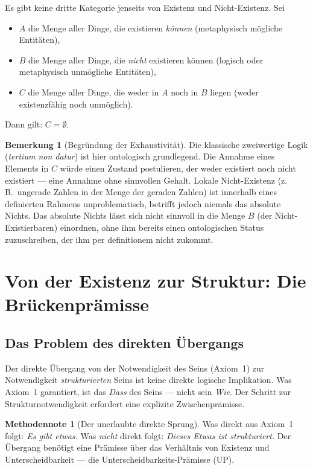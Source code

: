 \documentclass[11pt,a4paper]{article}
\theoremstyle{plain}
\theoremstyle{definition}
\newtheorem{remark}{Bemerkung}[section]
\newtheorem{methodennote}{Methodennote}[section]
\begin{document}
Es gibt keine dritte Kategorie jenseits von Existenz und Nicht-Existenz. Sei
\begin{itemize}
  \item $A$ die Menge aller Dinge, die existieren \emph{k\"{o}nnen} (metaphysisch m\"{o}gliche
        Entit\"{a}ten),
  \item $B$ die Menge aller Dinge, die \emph{nicht} existieren k\"{o}nnen (logisch oder
        metaphysisch unm\"{o}gliche Entit\"{a}ten),
  \item $C$ die Menge aller Dinge, die weder in $A$ noch in $B$ liegen (weder existenzf\"{a}hig
        noch unm\"{o}glich).
\end{itemize}
Dann gilt: $C = \emptyset$.

\begin{remark}[Begr\"{u}ndung der Exhaustivit\"{a}t]
Die klassische zweiwertige Logik (\emph{tertium non datur}) ist hier ontologisch
grundlegend. Die Annahme eines Elements in $C$ w\"{u}rde einen Zustand postulieren, der
weder existiert noch nicht existiert --- eine Annahme ohne sinnvollen Gehalt. Lokale
Nicht-Existenz (z.\,B.\ ungerade Zahlen in der Menge der geraden Zahlen) ist innerhalb
eines definierten Rahmens unproblematisch, betrifft jedoch niemals das absolute Nichts.
Das absolute Nichts l\"{a}sst sich nicht sinnvoll in die Menge $B$ (der
Nicht-Existierbaren) einordnen, ohne ihm bereits einen ontologischen Status zuzuschreiben,
der ihm per definitionem nicht zukommt.
\end{remark}

\section{Von der Existenz zur Struktur: Die Br\"{u}ckenpr\"{a}misse}

\subsection{Das Problem des direkten \"{U}bergangs}

Der direkte \"{U}bergang von der Notwendigkeit des Seins (Axiom~1) zur Notwendigkeit
\emph{strukturierten} Seins ist keine direkte logische Implikation. Was Axiom~1 garantiert,
ist das \emph{Dass} des Seins --- nicht sein \emph{Wie}. Der Schritt zur Strukturnotwendigkeit
erfordert eine explizite Zwischenpr\"{a}misse.

\begin{methodennote}[Der unerlaubte direkte Sprung]
Was direkt aus Axiom~1 folgt: \emph{Es gibt etwas.} Was \emph{nicht} direkt folgt:
\emph{Dieses Etwas ist strukturiert.} Der \"{U}bergang ben\"{o}tigt eine Pr\"{a}misse
\"{u}ber das Verh\"{a}ltnis von Existenz und Unterscheidbarkeit --- die
Unterscheidbarkeits-Pr\"{a}misse (UP).
\end{methodennote}
\end{document}
